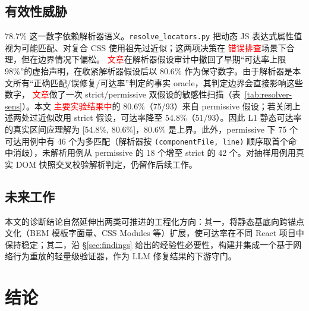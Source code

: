\documentclass[UTF8, a4paper, 10.5pt, twocolumn, fontset=none]{ctexart}
\providecommand{\DIFaddbegin}{} %
\providecommand{\DIFaddend}{} %
\providecommand{\DIFaddtex}[1]{\textcolor{red}{#1}} %
\providecommand{\DIFadd}[1]{\texorpdfstring{\DIFaddtex{#1}}{#1}} %
\providecommand{\DIFaddincludegraphics}[2][]{{\color{blue}\fbox{\DIFOincludegraphics[#1]{#2}}}} %
\DeclareRobustCommand{\DIFaddbegin}{\DIFOaddbegin \let\includegraphics\DIFaddincludegraphics} %
\DeclareRobustCommand{\DIFaddend}{\DIFOaddend \let\includegraphics\DIFOincludegraphics} %
\begin{document}
\subsection{有效性威胁}
78.7\% 这一数字依赖解析器语义。\texttt{resolve\_locators.py} 把动态 JS 表达式属性值视为可能匹配、对复合 CSS 使用祖先过近似；这两项决策在 \DIFaddbegin \DIFadd{错误排查}\DIFaddend 场景下合理，但在边界情况下偏松。 \DIFaddbegin \DIFadd{文章}\DIFaddend 在解析器假设审计中撤回了早期“可达率上限 98\%”的虚抬声明，在收紧解析器假设后以 80.6\% 作为保守数字。由于解析器是本文所有“正确匹配/误修复/可达率”判定的事实 oracle，其判定边界会直接影响这些数字， \DIFaddbegin \DIFadd{文章}\DIFaddend 做了一次 strict/permissive 双假设的敏感性扫描（表~\ref{tab:resolver-sens}）。本文 \DIFaddbegin \DIFadd{主要实验结果中}\DIFaddend 的 80.6\%（75/93）来自 permissive 假设；若关闭上述两处过近似改用 strict 假设，可达率降至 54.8\%（51/93）。因此 L1 静态可达率的真实区间应理解为 [54.8\%, 80.6\%]，80.6\% 是上界。此外，permissive 下 75 个可达用例中有 46 个为多匹配（解析器按 \texttt{(componentFile, line)} 顺序取首个命中消歧），未解析用例从 permissive 的 18 个增至 strict 的 42 个。对抽样用例用真实 DOM 快照交叉校验解析判定，仍留作后续工作。

\begin{table}[t]
\centering
\caption{解析器 strict/permissive 敏感性（koenig，$n=93$）。permissive 为本文所采用的假设；strict 关闭“动态属性值视为可能匹配”与“同文件祖先近似”两处过近似。}
\label{tab:resolver-sens}
\small
{}
\end{table}

\subsection{未来工作}
本文的诊断结论自然延伸出两类可推进的工程化方向：其一，将静态基底向跨锚点文化（BEM 模板字面量、CSS Modules 等）扩展，使可达率在不同 React 项目中保持稳定；其二，沿 \S\ref{sec:findings} 给出的经验性必要性，构建并集成一个基于网络行为重放的轻量级验证器，作为 LLM 修复结果的下游守门。

\section{结论}
\label{sec:conclusion}
\end{document}
